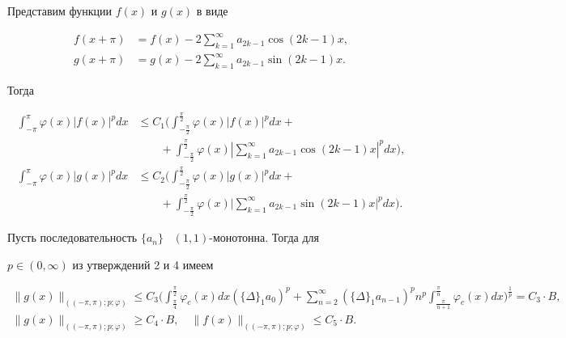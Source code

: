 Представим функции $f(x)$ и $g(x)$ в виде


\begin{align*}


f(x+ \pi) &= f(x) - 2 \sum\limits_{k=1}^{\infty} a_{2k-1} \cos (2k-1)x,\\


g(x+ \pi) &= g(x) - 2 \sum\limits_{k=1}^{\infty} a_{2k-1} \sin (2k-1)x.


\end{align*}


Тогда


\begin{align*}


\int_{-\pi}^{\pi} \varphi (x) | f(x) |^p dx &\leq


C_1 \bigg( \int_{-\frac{\pi}{2}}^{\frac{\pi}{2}} 


\varphi (x) | f(x)|^p dx + \\


&\qquad+\int_{-\frac{\pi}{2}}^{\frac{\pi}{2}} 


\varphi (x) | \sum\limits_{k=1}^{\infty}


a_{2k-1} \cos (2k-1)x |^p dx \bigg),\\


%


\int_{-\pi}^{\pi} \varphi (x) | g(x) |^p dx &\leq


C_2 \bigg( \int_{-\frac{\pi}{2}}^{\frac{\pi}{2}} 


\varphi (x) | g(x)|^p dx + \\


&\qquad +\int_{-\frac{\pi}{2}}^{\frac{\pi}{2}} 


\varphi (x) \bigg| \sum\limits_{k=1}^{\infty}


a_{2k-1} \sin (2k-1)x \bigg|^p dx \bigg).


\end{align*}





Пусть последовательность $\{a_n\}$ \ $(1,1)$-монотонна. Тогда для


$p \in (0, \infty)$ из утверждений 2 и 4 имеем 


\begin{gather*}


\| g(x)\| _{((-\pi,\pi);p;\varphi )}


\leq C_3 \bigg( \int_{\frac{\pi}{4}}^{\frac{\pi}{2}} \varphi_c(x)


dx (\{\Delta\}_1 a_0)^p + 


\sum\limits_{n=2}^{\infty} (\{\Delta\}_1 a_{n-1})^p n^p


\int_{\frac{\pi}{n+1}}^{\frac{\pi}{n}}


\varphi_c(x) dx\bigg)^{\frac{1}{p}} = C_3 \cdot B,\\


\| g(x)\| _{((-\pi,\pi);p;\varphi )} \geq C_4\cdot B,\quad


\| f(x)\| _{((-\pi,\pi);p;\varphi )} \leq C_5\cdot B.


\end{gather*}





